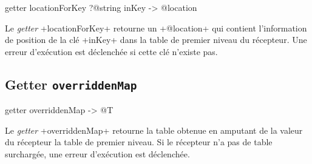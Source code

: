
\begin{galgas3}
getter locationForKey ?@string inKey -> @location
\end{galgas3}


Le \emph{getter} \ggst+locationForKey+ retourne un \ggst+@location+ qui contient l'information de position de la clé \ggst+inKey+ dans la table de premier niveau du récepteur. Une erreur d'exécution est déclenchée si cette clé n'existe pas.








\subsection{Getter \texttt{overriddenMap}}

\begin{galgas3}
getter overriddenMap -> @T
\end{galgas3}


Le \emph{getter} \ggst+overriddenMap+ retourne la table obtenue en amputant de la valeur du récepteur la table de premier niveau. Si le récepteur n'a pas de table surchargée, une erreur d'exécution est déclenchée.









